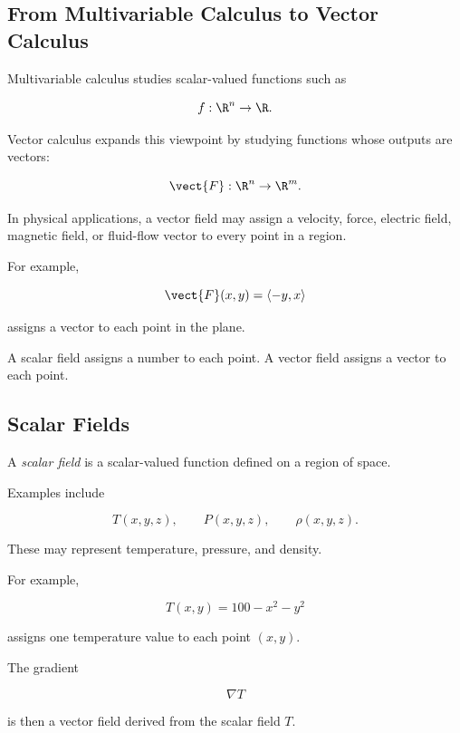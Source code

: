\subsection{From Multivariable Calculus to Vector Calculus}
\label{subsec:from-multivariable-to-vector-calculus}

Multivariable calculus studies scalar-valued functions such as

\[ f:\R^n\to\R. \]

Vector calculus expands this viewpoint by studying functions whose outputs
are vectors:

\[ \vect{F}:\R^n\to\R^m. \]

In physical applications, a vector field may assign a velocity, force,
electric field, magnetic field, or fluid-flow vector to every point in a
region.

For example,

\[ \vect{F}(x,y)=\langle-y,x\rangle \]

assigns a vector to each point in the plane.

\begin{conceptbox}
A scalar field assigns a number to each point. A vector field assigns a
vector to each point.
\end{conceptbox}

\subsection{Scalar Fields}
\label{subsec:scalar-fields}

A \emph{scalar field} is a scalar-valued function defined on a region of
space.

Examples include

\[ T(x,y,z),\qquad P(x,y,z),\qquad \rho(x,y,z). \]

These may represent temperature, pressure, and density.

For example,

\[ T(x,y)=100-x^2-y^2 \]

assigns one temperature value to each point \((x,y)\).

The gradient

\[ \nabla T \]

is then a vector field derived from the scalar field \(T\).

